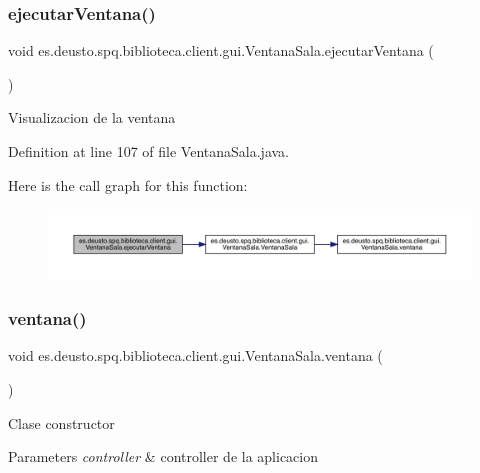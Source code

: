 \subsubsection{\texorpdfstring{ejecutar\+Ventana()}{ejecutarVentana()}}
{\footnotesize\ttfamily void es.\+deusto.\+spq.\+biblioteca.\+client.\+gui.\+Ventana\+Sala.\+ejecutar\+Ventana (\begin{DoxyParamCaption}{ }\end{DoxyParamCaption})}

Visualizacion de la ventana 

Definition at line 107 of file Ventana\+Sala.\+java.

Here is the call graph for this function\+:
\nopagebreak
\begin{figure}[H]
\begin{center}
\leavevmode
\includegraphics[width=350pt]{classes_1_1deusto_1_1spq_1_1biblioteca_1_1client_1_1gui_1_1_ventana_sala_a651e8570ad62b5a769b2e45e51291694_cgraph}
\end{center}
\end{figure}
\mbox{\label{classes_1_1deusto_1_1spq_1_1biblioteca_1_1client_1_1gui_1_1_ventana_sala_adeb222b4e7905f68619c913a62814a8e}} 
\subsubsection{\texorpdfstring{ventana()}{ventana()}}
{\footnotesize\ttfamily void es.\+deusto.\+spq.\+biblioteca.\+client.\+gui.\+Ventana\+Sala.\+ventana (\begin{DoxyParamCaption}{ }\end{DoxyParamCaption})}

Clase constructor 
\begin{DoxyParams}{Parameters}
{\em controller} & controller de la aplicacion \\
\hline
\end{DoxyParams}


